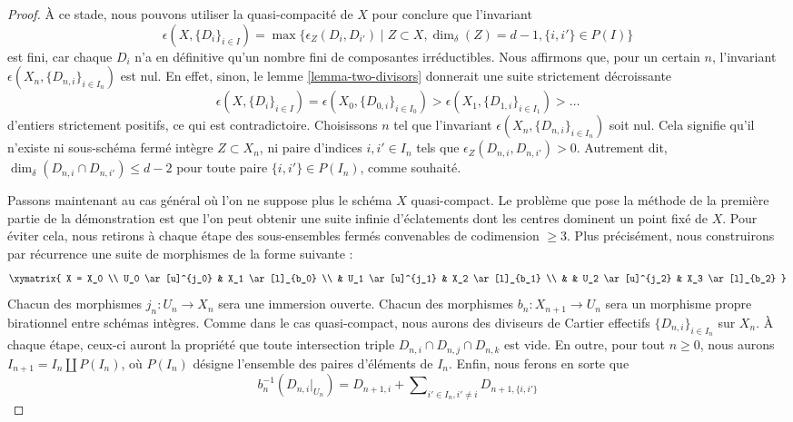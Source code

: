 \begin{proof}
\medskip\noindent
À ce stade, nous pouvons utiliser la quasi-compacité de $X$
pour conclure que l'invariant
\begin{equation}
\label{equation-invariant}
\epsilon(X, \{D_i\}_{i \in I}) =
\max\{\epsilon_Z(D_i, D_{i'}) \mid
Z \subset X,
\dim_\delta(Z) = d - 1,
\{i, i'\} \in P(I)\}
\end{equation}
est fini, car chaque $D_i$ n'a en définitive qu'un nombre fini de composantes
irréductibles. Nous affirmons que, pour un certain $n$, l'invariant
$\epsilon(X_n, \{D_{n, i}\}_{i \in I_n})$ est nul. En effet, sinon,
le lemme \ref{lemma-two-divisors} donnerait une suite strictement décroissante
$$
\epsilon(X, \{D_i\}_{i \in I})
=
\epsilon(X_0, \{D_{0, i}\}_{i \in I_0})
>
\epsilon(X_1, \{D_{1, i}\}_{i \in I_1})
>
\ldots
$$
d'entiers strictement positifs, ce qui est contradictoire. Choisissons $n$ tel que
l'invariant $\epsilon(X_n, \{D_{n, i}\}_{i \in I_n})$ soit nul.
Cela signifie qu'il n'existe ni sous-schéma fermé intègre $Z \subset X_n$,
ni paire d'indices $i, i' \in I_n$
tels que $\epsilon_Z(D_{n, i}, D_{n, i'}) > 0$.
Autrement dit, $\dim_\delta(D_{n, i} \cap D_{n, i'}) \leq d - 2$ pour
toute paire $\{i, i'\} \in P(I_n)$, comme souhaité.

\medskip\noindent
Passons maintenant au cas général où l'on ne suppose plus
le schéma $X$ quasi-compact. Le problème que pose la méthode de
la première partie de la démonstration est que l'on peut obtenir une suite infinie
d'éclatements dont les centres dominent un point fixé de $X$. Pour
éviter cela, nous retirons à chaque étape des sous-ensembles fermés convenables de codimension $\geq 3$.
Plus précisément, nous construirons par récurrence
une suite de morphismes de la forme suivante :
$$
\xymatrix{
X = X_0 \\
U_0 \ar[u]^{j_0} & X_1 \ar[l]_{b_0} \\
 & U_1 \ar[u]^{j_1} & X_2 \ar[l]_{b_1} \\
 & & U_2 \ar[u]^{j_2} & X_3 \ar[l]_{b_2}
}
$$
Chacun des morphismes $j_n : U_n \to X_n$ sera une immersion ouverte.
Chacun des morphismes $b_n : X_{n + 1} \to U_n$ sera un morphisme propre
birationnel entre schémas intègres. Comme dans le cas quasi-compact, nous aurons
des diviseurs de Cartier effectifs $\{D_{n, i}\}_{i \in I_n}$ sur $X_n$.
À chaque étape, ceux-ci auront la propriété que toute intersection triple
$D_{n, i} \cap D_{n, j} \cap D_{n, k}$ est vide.
En outre, pour tout $n \geq 0$, nous aurons
$I_{n + 1} = I_n \amalg P(I_n)$, où $P(I_n)$ désigne
l'ensemble des paires d'éléments de $I_n$.
Enfin, nous ferons en sorte que
$$
b_n^{-1}(D_{n, i}|_{U_n}) = D_{n + 1, i} +
\sum\nolimits_{i' \in I_n, i' \not = i} D_{n + 1, \{i, i'\}}
$$


\end{proof}
